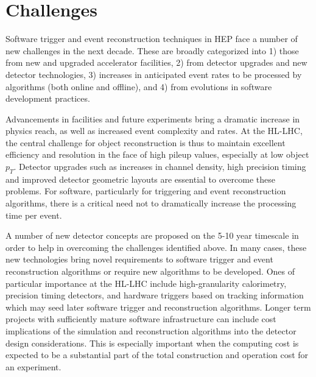 \section{Challenges}

Software trigger and event reconstruction techniques in HEP face a number of new challenges in the next decade. These are broadly categorized into 1) those from new and upgraded accelerator facilities, 2) from detector upgrades and new detector technologies, 3) increases in anticipated event rates to be processed by algorithms (both online and offline), and 4) from evolutions in software development practices.

Advancements in facilities and future experiments bring a dramatic increase in physics reach, as well as increased event complexity and rates. At the HL-LHC, the central challenge for object reconstruction is thus to maintain excellent efficiency and resolution in the face of high pileup values, especially at low object $p_T$. Detector upgrades such as increases in channel density, high precision timing and improved detector geometric layouts are essential to overcome these problems. For software, particularly for triggering and event reconstruction algorithms, there is a critical need not to dramatically increase the processing time per event.

A number of new detector concepts are proposed on the 5-10 year timescale in order to help in overcoming the challenges identified above. In many cases, these new technologies bring novel requirements to software trigger and event reconstruction algorithms or require new algorithms to be developed. Ones of particular importance at the HL-LHC include high-granularity calorimetry, precision timing detectors, and hardware triggers based on tracking information which may seed later software trigger and reconstruction algorithms. Longer term projects with sufficiently mature software infrastructure can include cost implications of the simulation and reconstruction algorithms into the detector design considerations. This is especially important when the computing cost is expected to be a substantial part of the total construction and operation cost for an experiment. 

